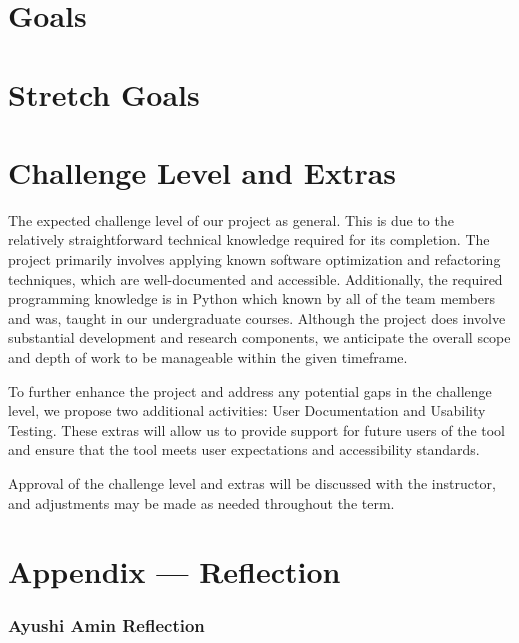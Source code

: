 \documentclass{article}
\begin{document}

\section{Goals}

\section{Stretch Goals}

\section{Challenge Level and Extras}

The expected challenge level of our project as general. This is due to the 
relatively straightforward technical knowledge required for its completion. 
The project primarily involves applying known software optimization and 
refactoring techniques, which are well-documented and accessible. 
Additionally, the required programming knowledge is in Python which known 
by all of the team members and was, taught in our undergraduate courses. 
Although the project does involve substantial development and research components, 
we anticipate the overall scope and depth of work to be manageable within the 
given timeframe.

To further enhance the project and address any potential gaps in the challenge level, 
we propose two additional activities: User Documentation and Usability Testing. 
These extras will allow us to provide support for future users of the tool and 
ensure that the tool meets user expectations and accessibility standards. 

Approval of the challenge level and extras will be discussed with the instructor, 
and adjustments may be made as needed throughout the term.

\newpage{}

\section*{Appendix --- Reflection}




\subsubsection*{Ayushi Amin Reflection}
\end{document}
